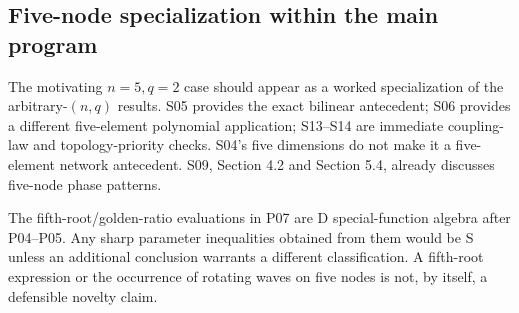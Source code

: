 \subsection{Five-node specialization within the main program}
The motivating $n=5,q=2$ case should appear as a worked specialization of
the arbitrary-$(n,q)$ results. S05 provides the exact bilinear antecedent;
S06 provides a different five-element polynomial application; S13--S14
are immediate coupling-law and topology-priority checks. S04's five
dimensions do not make it a five-element network antecedent. S09,
Section 4.2 and Section 5.4, already discusses five-node phase patterns.

The fifth-root/golden-ratio evaluations in P07 are D special-function
algebra after P04--P05. Any sharp parameter inequalities obtained from
them would be S unless an additional conclusion warrants a different
classification. A fifth-root expression or the occurrence of rotating
waves on five nodes is not, by itself, a defensible novelty claim.

